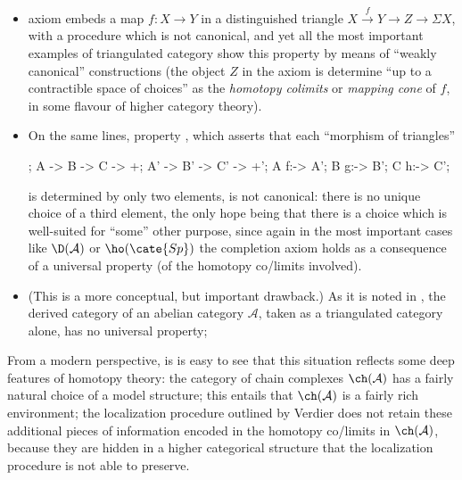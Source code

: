 \documentclass[11pt, a4paper]{amsart}
\renewcommand{\A}{\mathcal{A}}
\begin{document}
\begin{itemize}
\item axiom  embeds a map $f\colon X\to Y$ in a distinguished triangle $X\overset{f}\to Y\to Z\to \Sigma X$, with a procedure which is not canonical, and yet all the most important examples of triangulated category show this property by means of ``weakly canonical'' constructions (the object $Z$ in the axiom is determine ``up to a contractible space of choices'' as the \emph{homotopy colimits} or \emph{mapping cone} of $f$, in some flavour of higher category theory).
\item On the same lines, property , which asserts that each ``morphism of triangles''
\begin{center}
\begin{kD}
;
\mor A -> B -> C -> +;
\mor A' -> B' -> C' -> +';
\mor A f:-> A'; \mor B g:-> B'; \mor C h:-> C';
\end{kD}
\end{center}
is determined by only two elements, is not canonical: there is no unique choice of a third element, the only hope being that there is a choice which is well-suited for ``some'' other purpose, since again in the most important cases like $\D(\A)$ or $\ho(\cate{Sp})$ the completion axiom holds as a consequence of a universal property (of the homotopy co\fshyp{}limits involved).
\item (This is a more conceptual, but important drawback.) As it is noted in \cite{maltsiniotis2007k}, the derived category of an abelian category $\A$, taken as a triangulated category alone, has no universal property;
\end{itemize}
From a modern perspective, is is easy to see that this situation reflects some deep features of homotopy theory: the category of chain complexes $\ch(\A)$ has a fairly natural choice of a model structure; this entails that $\ch(\A)$ is a fairly rich environment; the localization procedure outlined by Verdier does not retain these additional pieces of information encoded in the homotopy co/limits in $\ch(\A)$, because they are hidden in a higher categorical structure that the localization procedure is not able to preserve.
\end{document}
